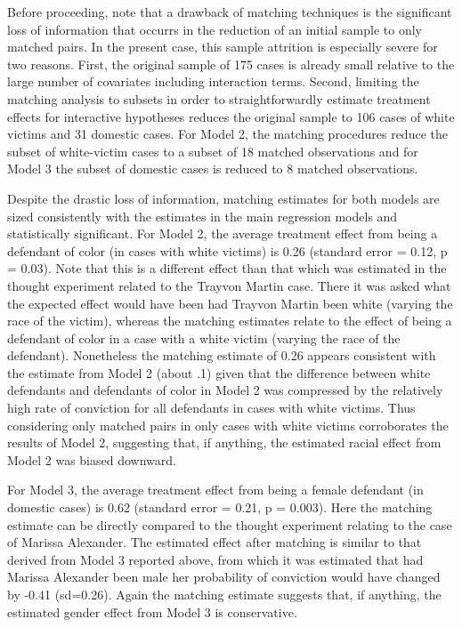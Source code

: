 \documentclass[12pt,article]{article}
\begin{document}
Before proceeding, note that a drawback of matching techniques is the
significant loss of information that occurrs in the reduction of an
initial sample to only matched pairs. In the present case, this sample
attrition is especially severe for two reasons. First, the original
sample of 175 cases is already small relative to the large number of
covariates including interaction terms. Second, limiting the matching
analysis to subsets in order to straightforwardly estimate treatment
effects for interactive hypotheses reduces the original sample to 106
cases of white victims and 31 domestic cases. For Model 2, the matching
procedures reduce the subset of white-victim cases to a subset of 18
matched observations and for Model 3 the subset of domestic cases is
reduced to 8 matched observations.

Despite the drastic loss of information, matching estimates for both
models are sized consistently with the estimates in the main regression
models and statistically significant. For Model 2, the average treatment
effect from being a defendant of color (in cases with white victims) is
0.26 (standard error = 0.12, p = 0.03). Note that this is a different
effect than that which was estimated in the thought experiment related
to the Trayvon Martin case. There it was asked what the expected effect
would have been had Trayvon Martin been white (varying the race of the
victim), whereas the matching estimates relate to the effect of being a
defendant of color in a case with a white victim (varying the race of
the defendant). Nonetheless the matching estimate of 0.26 appears
consistent with the estimate from Model 2 (about .1) given that the
difference between white defendants and defendants of color in Model 2
was compressed by the relatively high rate of conviction for all
defendants in cases with white victims. Thus considering only matched
pairs in only cases with white victims corroborates the results of Model
2, suggesting that, if anything, the estimated racial effect from Model
2 was biased downward.

For Model 3, the average treatment effect from being a female defendant
(in domestic cases) is 0.62 (standard error = 0.21, p = 0.003). Here the
matching estimate can be directly compared to the thought experiment
relating to the case of Marissa Alexander. The estimated effect after
matching is similar to that derived from Model 3 reported above, from
which it was estimated that had Marissa Alexander been male her
probability of conviction would have changed by -0.41 (sd=0.26). Again
the matching estimate suggests that, if anything, the estimated gender
effect from Model 3 is conservative.
\end{document}
